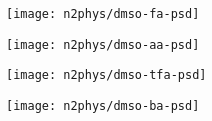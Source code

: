 \begin{figure}[!htb]
    \begin{subfigure}{0.25\linewidth}
        \texttt{[image: n2phys/dmso-fa-psd]}%
        \label{appx:def:fig:psd-dmso-fa}
    \end{subfigure}%
    \begin{subfigure}{0.25\linewidth}
        \texttt{[image: n2phys/dmso-aa-psd]}%
        \label{appx:def:fig:psd-dmso-aa}
    \end{subfigure}%
    \begin{subfigure}{0.25\linewidth}
        \texttt{[image: n2phys/dmso-tfa-psd]}%
        \label{appx:def:fig:psd-dmso-tfa}
    \end{subfigure}%
    \begin{subfigure}{0.25\linewidth}
        \texttt{[image: n2phys/dmso-ba-psd]}%
        \label{appx:def:fig:psd-dmso-ba}
    \end{subfigure}%

\end{figure}

